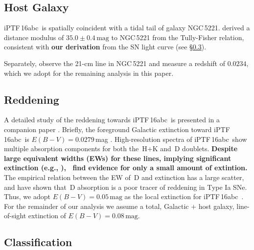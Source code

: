 \documentclass[twocolumn]{aastex61}
\newcommand{\abc}{iPTF\,16abc}
\begin{document}
\subsection{Host Galaxy}
\label{sec:host}

\abc\ is spatially coincident with a tidal tail of galaxy NGC\,5221.
\citet{2007A&A...465...71T} derived a distance modulus of
$35.0\pm0.4\,\textrm{mag}$ to NGC\,5221 from the Tully-Fisher relation,
consistent with \textbf{our derivation} from the SN light curve (see
\S\ref{sec:classification}).

Separately, \citet{2015MNRAS.447.1531C} observe the 21-cm line in NGC\,5221
and measure a redshift of $0.0234$, which we adopt for the remaining analysis
in this paper.

\subsection{Reddening}
\label{sec:reddening}

A detailed study of the reddening towards \abc\ is presented in a companion
paper \citep{2017A&A...606A.111F}. Briefly, the foreground Galactic extinction
toward \abc\ is $E(B-V) = 0.0279$\,mag \citep{2011ApJ...737..103S}.
High-resolution spectra of \abc\ show multiple absorption components for both
the \,H$+$K and \,D doublets. \textbf{Despite large
equivalent widths (EWs) for these lines, implying significant extinction
(e.g., \citealt{2012MNRAS.426.1465P}), \citeauthor{2017A&A...606A.111F}~find
evidence for only a small amount of extintion.} The empirical relation between
the EW of \,D and extinction has a large scatter, and
\citet{2013ApJ...779...38P} have shown that \,D absorption is a
poor tracer of reddening in Type Ia SNe. Thus, we adopt $E(B-V) = 0.05 \,
\mathrm{mag}$ as the local extinction for \abc\ \citep{2017A&A...606A.111F}.
For the remainder of our analysis we assume a total, Galactic $+$ host galaxy,
line-of-sight extinction of $E(B-V) = 0.08 \, \mathrm{mag}$.

\subsection{Classification}
\label{sec:classification}
\end{document}
